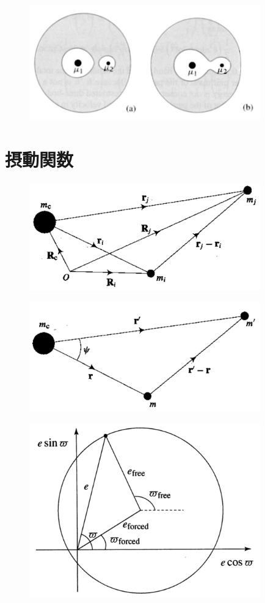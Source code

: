 \documentclass[11pt,a4paper,oneside,onecolumn]{jarticle}
\begin{document}
\begin{figure}[H]
\centering
\includegraphics[width=10cm]{./image/sec3_2.pdf}
\caption{\label{}}
\end{figure}


\section{摂動関数}

\begin{figure}[H]
\centering
\includegraphics[width=10cm]{./image/sec6_1.pdf}
\caption{\label{}}
\end{figure}

\begin{figure}[H]
\centering
\includegraphics[width=10cm]{./image/sec6_2.pdf}
\caption{\label{}}
\end{figure}


\begin{figure}[H]
\centering
\includegraphics[width=10cm]{./image/sec7_2.pdf}
\caption{\label{}}
\end{figure}
\end{document}
